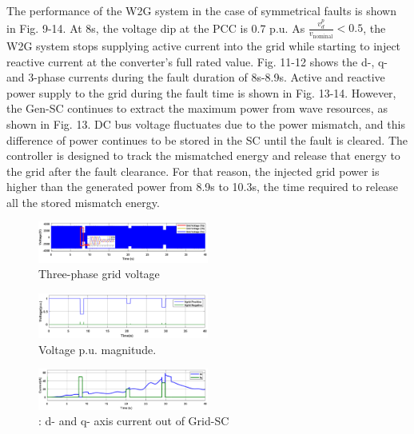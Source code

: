 \documentclass[conference]{IEEEtran}
\begin{document}
The performance of the W2G system in the case of symmetrical faults is shown in Fig. 9-14. At 8s, the voltage dip at the PCC is 0.7 p.u. As \( \frac{v_d^p}{v_{\text{nominal}}} < 0.5 \), the W2G system stops supplying active current into the grid while starting to inject reactive current at the converter’s full rated value. Fig. 11-12 shows the d-, q- and 3-phase currents during the fault duration of 8s-8.9s. Active and reactive power supply to the grid during the fault time is shown in Fig. 13-14. However, the Gen-SC continues to extract the maximum power from wave resources, as shown in Fig. 13. DC bus voltage fluctuates due to the power mismatch, and this difference of power continues to be stored in the SC until the fault is cleared. The controller is designed to track the mismatched energy and release that energy to the grid after the fault clearance. For that reason, the injected grid power is higher than the generated power from 8.9s to 10.3s, the time required to release all the stored mismatch energy.
\begin{figure}[htbp]
    \centering
    \includegraphics[width=0.5\textwidth]{Figs/5_3_1/voltage abc.png}
    \caption{Three-phase grid voltage}
    \label{fig:W2G_normal_grid}
\end{figure}
\begin{figure}[h!]
    \centering
    \includegraphics[width=0.5\textwidth]{Figs/5_3_1/voltage pu.png}
    \caption{Voltage p.u. magnitude.}
    \label{fig:LPMG_position_velocity}
\end{figure}
\begin{figure}[h!]
    \centering
    \includegraphics[width=0.5\textwidth]{Figs/5_3_1/idq.png}
    \caption{: d- and q- axis current out of Grid-SC}
    \label{fig:W2G_normal_grid}
\end{figure}
\end{document}

